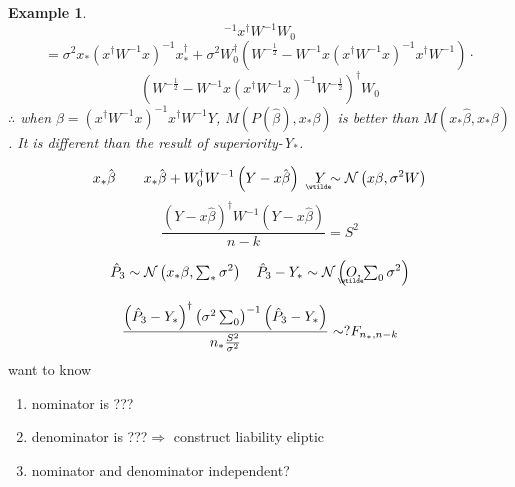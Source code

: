 \documentclass{article}
\newtheorem{example}[theorem]{Example}
\begin{document}
\begin{example}
\begin{equation*}
^{-1}x^{\dagger }W^{-1}W_{0}
\end{equation*}%
\begin{equation*}
=\sigma ^{2}x_{\ast }\left( x^{\dagger }W^{-1}x\right) ^{-1}x_{\ast
}^{\dagger }+\sigma ^{2}W_{0}^{\dagger }\left( W^{-\frac{1}{2}%
}-W^{-1}x\left( x^{\dagger }W^{-1}x\right) ^{-1}x^{\dagger }W^{-1}\right)
\cdot
\end{equation*}%
\begin{equation*}
\left( W^{-\frac{1}{2}}-W^{-1}x\left( x^{\dagger }W^{-1}x\right) ^{-1}W^{-%
\frac{1}{2}}\right) ^{\dagger }W_{0}
\end{equation*}%
$\therefore $ when $\hat{\beta}=\left( x^{\dagger }W^{-1}x\right)
^{-1}x^{\dagger }W^{-1}Y$, $M\left( P\left( \hat{\beta}\right) ,x_{\ast
}\beta \right) $ is better than $M\left( x_{\ast }\hat{\beta},x_{\ast }\beta
\right) $. It is different than the result of superiority-Y$_{\ast }$.
\end{example}

\bigskip

\bigskip

\begin{equation*}
x_{\ast }\hat{\beta}\quad \quad x_{\ast }\hat{\beta}+W_{0}^{\dagger
}W^{-1}\left( Y-x\hat{\beta}\right) \quad 
\underaccent{\wtilde}{Y}%
\sim \mathcal{N}\left( x\beta ,\sigma ^{2}W\right) 
\end{equation*}%
\begin{equation*}
\frac{\left( Y-x\hat{\beta}\right) ^{\dagger }W^{-1}\left( Y-x\hat{\beta}%
\right) }{n-k}=S^{2}
\end{equation*}

\begin{equation*}
\hat{P}_{3}\sim \mathcal{N}\left( x_{\ast }\beta ,\tsum\nolimits_{\ast
}\sigma ^{2}\right) \quad \hat{P}_{3}-Y_{\ast }\sim \mathcal{N}\left( 
\underaccent{\wtilde}{O}%
,\tsum\nolimits_{0}\sigma ^{2}\right) 
\end{equation*}

\begin{equation*}
\frac{\left( \hat{P}_{3}-Y_{\ast }\right) ^{\dagger }\left( \sigma
^{2}\tsum\nolimits_{0}\right) ^{-1}\left( \hat{P}_{3}-Y_{\ast }\right) }{%
n_{\ast }\frac{S^{2}}{\sigma ^{2}}}\sim ?F_{n_{\ast },n-k}
\end{equation*}%
want to know

\begin{enumerate}
\item nominator is ???

\item denominator is ???\qquad \qquad \qquad \qquad \qquad $\Longrightarrow $%
construct liability eliptic

\item nominator and denominator independent?
\end{enumerate}
\end{document}
